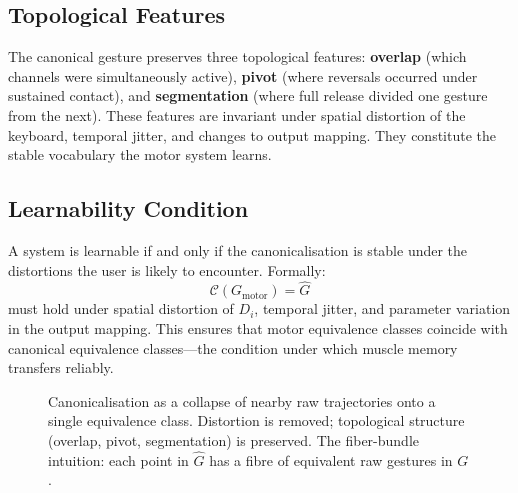 \documentclass[11pt, a4paper]{article}
\begin{document}
\subsection{Topological Features}

The canonical gesture preserves three topological features:
\textbf{overlap} (which channels were simultaneously active),
\textbf{pivot} (where reversals occurred under sustained contact), and
\textbf{segmentation} (where full release divided one gesture from the
next). These features are invariant under spatial distortion of the
keyboard, temporal jitter, and changes to output mapping. They constitute
the stable vocabulary the motor system learns.

\subsection{Learnability Condition}

A system is learnable if and only if the canonicalisation is stable under
the distortions the user is likely to encounter. Formally:
\[
  \mathcal{C}(G_{\mathrm{motor}}) = \hat{G}
\]
must hold under spatial distortion of $D_i$, temporal jitter, and
parameter variation in the output mapping. This ensures that motor
equivalence classes coincide with canonical equivalence classes---the
condition under which muscle memory transfers reliably.

\begin{figure}[h]
\centering
{}
\caption{Canonicalisation as a collapse of nearby raw trajectories onto a
single equivalence class. Distortion is removed; topological structure
(overlap, pivot, segmentation) is preserved. The fiber-bundle intuition:
each point in $\hat{G}$ has a fibre of equivalent raw gestures in $G$.}
\label{fig:canonicalisation}
\end{figure}
\end{document}
